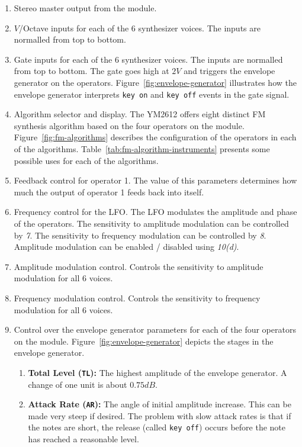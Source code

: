 \documentclass[12pt,letter]{article}
\begin{document}
\begin{enumerate}
  \item Stereo master output from the module.
  \item $V$/Octave inputs for each of the 6 synthesizer voices. The inputs are normalled from top to bottom.
  \item Gate inputs for each of the 6 synthesizer voices.  The inputs are normalled from top to bottom. The gate goes high at $2V$ and triggers the envelope generator on the operators. Figure~\ref{fig:envelope-generator} illustrates how the envelope generator interprets \texttt{key on} and \texttt{key off} events in the gate signal.
  \item Algorithm selector and display. The YM2612 offers eight distinct FM synthesis algorithm based on the four operators on the module. Figure~\ref{fig:fm-algorithms} describes the configuration of the operators in each of the algorithms. Table~\ref{tab:fm-algorithm-instruments} presents some possible uses for each of the algorithms.
  \item Feedback control for operator 1. The value of this parameters determines how much the output of operator 1 feeds back into itself.
  \item Frequency control for the LFO. The LFO modulates the amplitude and phase of the operators. The sensitivity to amplitude modulation can be controlled by \textit{7}. The sensitivity to frequency modulation can be controlled by \textit{8}. Amplitude modulation can be enabled / disabled using \textit{10(d)}.
  \item Amplitude modulation control. Controls the sensitivity to amplitude modulation for all 6 voices.
  \item Frequency modulation control. Controls the sensitivity to frequency modulation for all 6 voices.
\clearpage
  \item Control over the envelope generator parameters for each of the four operators on the module. Figure~\ref{fig:envelope-generator} depicts the stages in the envelope generator. \begin{enumerate}
    \item \textbf{Total Level (\texttt{TL}):} The highest amplitude of the envelope generator. A change of one unit is about $0.75dB$.
    \item \textbf{Attack Rate (\texttt{AR}):} The angle of initial amplitude increase. This can be made very steep if desired. The problem with slow attack rates is that if the notes are short, the release (called \texttt{key off}) occurs before the note has reached a reasonable level.

\end{enumerate}
\end{enumerate}
\end{document}
